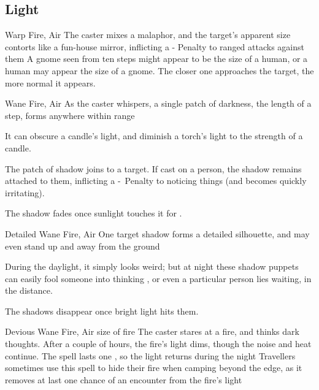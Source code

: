 \begin{multicols}{2}

\subsection{Light}
\label{lightSpells}

  {}%
  {Warp}%
  {Fire, Air}%
  {}%
  {The caster mixes a malaphor, and the target's apparent size contorts like a fun-house mirror, inflicting a - Penalty to ranged attacks against them}%
  {A gnome seen from ten steps might appear to be the size of a human, or a human may appear the size of a gnome.
    The closer one approaches the target, the more normal it appears.}



  {}%
  {Wane}%
  {Fire, Air}%
  {}%
  {As the caster whispers, a single patch of darkness, the length of a step, forms anywhere within range}%
  {It can obscure a candle's light, and diminish a torch's light to the strength of a candle.

    The patch of shadow joins to a target.
    If cast on a person, the shadow remains attached to them, inflicting a -~Penalty to noticing things (and becomes quickly irritating).

    The shadow fades once sunlight touches it for .}





  {Detailed}%
  {Wane}%
  {Fire, Air}%
  {}%
  {One target shadow forms a detailed silhouette, and may even stand up and away from the ground}%
  {During the daylight, it simply looks weird; but at night these shadow puppets can easily fool someone into thinking , or even a particular person lies waiting, in the distance.

  The shadows disappear once bright light hits them.}

  {Devious}%
  {Wane}%
  {Fire, Air}%
  {size of fire}%
  {The caster stares at a fire, and thinks dark thoughts.
  After a couple of hours, the fire's light dims, though the noise and heat continue.
  The spell lasts one \showOnset, so the light returns during the night}%
  {Travellers sometimes use this spell to hide their fire when camping beyond the \gls{edge}, as it removes at last one chance of an encounter from the fire's light}



\end{multicols}
